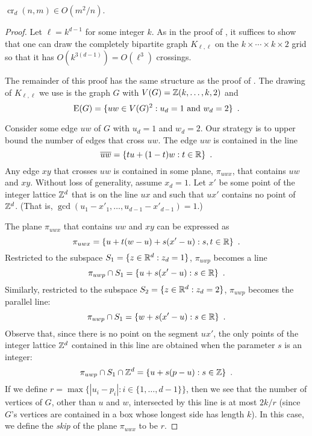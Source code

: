 \documentclass{patmorin}
\DeclareMathOperator{\crs}{cr}
\begin{document}
\begin{thm}
  $\crs_d(n,m)\in O(m^2/n)$.
\end{thm}

\begin{proof}
Let $\ell=k^{d-1}$ for some integer $k$.  As in the proof of
, it suffices to show that one can draw the
completely bipartite graph $K_{\ell,\ell}$ on the $k\times\cdots\times
k\times 2$ grid so that it has $O(k^{3(d-1)})=O(\ell^3)$ crossings.

The remainder of this proof has the same structure as the proof of
.  The drawing of $K_{\ell,\ell}$ we use is the graph $G$
with $V(G)=\mathbb{Z}(k,\ldots,k,2)$ and
\[
  \mathrm{E}(G) = \{ uw\in V(G)^2 :\mbox{$u_d = 1$ and $w_d = 2$} \} \enspace .
\]

Consider some edge $uw$ of $G$ with $u_d=1$ and $w_d=2$.  Our strategy
is to upper bound the number of edges that cross $uw$.  
The edge $uw$ is contained in the line
\[  \overline{uw} = \{ tu + (1-t)w : t\in \mathbb{R} \} \enspace . \]
Any edge $xy$ that crosses $uw$ is contained in some plane, $\pi_{uwx}$,
that contains $uw$ and $xy$.  Without loss of generality, assume $x_d=1$.
Let $x'$ be some point of the integer lattice $\mathbb{Z}^d$ that is on the
line $ux$ and such that $ux'$ contains no point of $\mathbb{Z}^d$. (That is,
$\gcd(u_1-x'_1,\ldots,u_{d-1}-x'_{d-1}) = 1$.)

The plane $\pi_{uwx}$ that contains $uw$ and $xy$ can be expressed as
\[
   \pi_{uwx} = \{ u + t(w-u) + s(x'-u) : s,t\in\mathbb{R}\} \enspace .
\]
Restricted to the subspace $S_1=\{z\in\mathbb{R}^d: z_d=1\}$, $\pi_{uwp}$ becomes a line
\[
   \pi_{uwp}\cap S_1 = \{ u + s(x'-u) : s\in\mathbb{R}\} \enspace .
\]
Similarly, restricted to the subspace $S_2=\{z\in\mathbb{R}^d: z_d=2\}$, $\pi_{uwp}$
becomes the parallel line:
\[
   \pi_{uwp}\cap S_1 = \{ w + s(x'-u) : s\in\mathbb{R}\} \enspace .
\]
Observe that, since there is no point on the segment $ux'$, the only points
of the integer lattice $\mathbb{Z}^d$ contained in this line are obtained when
the parameter $s$ is an integer:
\[
   \pi_{uwp}\cap S_1\cap\mathbb{Z}^d = \{ u + s(p-u) : s\in\mathbb{Z}\} \enspace .
\]
If we define $r=\max\{|u_i-p_i| : i\in\{1,\ldots,d-1\}\}$, then we see
that the number of vertices of $G$, other than $u$ and $w$, intersected
by this line is at most $2k/r$ (since $G$'s vertices are contained in
a box whose longest side has length $k$).  In this case, we define the
\emph{skip} of the plane $\pi_{uwx}$ to be $r$.


\end{proof}
\end{document}
